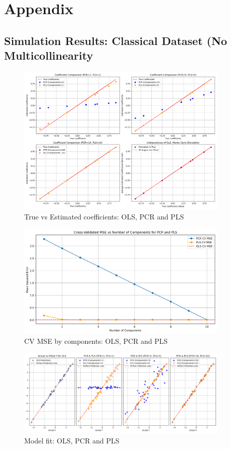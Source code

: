 \documentclass[11pt,twoside,a4paper]{article}
\begin{document}
\section{Appendix}
\subsection{Simulation Results: Classical Dataset (No Multicollinearity}

\begin{figure}[H]
    \centering
    \includegraphics[width=0.9\textwidth]{First_plot.png}
    \caption{True vs Estimated coefficients: OLS, PCR and PLS}
    \label{fig:Classic_data_analysis}
\end{figure}

\begin{figure}[H]
    \centering
    \includegraphics[width=0.9\textwidth]{Second_plot.png}
    \caption{CV MSE by components: OLS, PCR and PLS}
    \label{fig:Classic_data_analysis}
\end{figure}

\begin{figure}[H]
    \centering
    \includegraphics[width=0.9\textwidth]{Third_plot.png}
    \caption{Model fit: OLS, PCR and PLS}
    \label{fig:Classic_data_analysis}
\end{figure}
\end{document}
